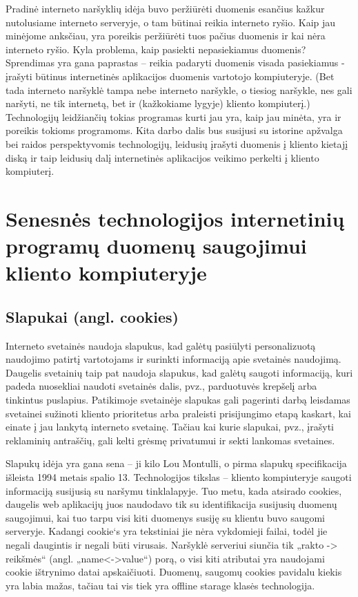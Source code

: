 \documentclass[12pt,a4paper,titlepage]{article}
\begin{document}
Pradinė interneto naršyklių idėja buvo peržiūrėti duomenis esančius kažkur nutolusiame interneto serveryje, o tam būtinai reikia interneto ryšio. Kaip jau minėjome anksčiau, yra poreikis peržiūrėti tuos pačius duomenis ir kai nėra interneto ryšio. Kyla problema, kaip pasiekti nepasiekiamus duomenis? Sprendimas yra gana paprastas – reikia padaryti duomenis visada pasiekiamus - įrašyti būtinus internetinės aplikacijos duomenis vartotojo kompiuteryje. (Bet tada interneto naršyklė tampa nebe interneto naršykle, o tiesiog naršykle, nes gali naršyti, ne tik internetą, bet ir (kažkokiame lygyje) kliento kompiuterį.) Technologijų leidžiančių tokias programas kurti jau yra, kaip jau minėta, yra ir poreikis tokioms programoms. Kita darbo dalis bus susijusi su istorine apžvalga bei raidos perspektyvomis technologijų, leidusių įrašyti duomenis į kliento kietajį diską ir taip leidusių dalį internetinės aplikacijos veikimo perkelti į kliento kompiuterį. 

\section{Senesnės technologijos internetinių programų duomenų saugojimui kliento kompiuteryje}

\subsection{Slapukai (angl. cookies)}

Interneto svetainės naudoja slapukus, kad galėtų pasiūlyti personalizuotą naudojimo patirtį vartotojams ir surinkti informaciją apie svetainės naudojimą. Daugelis svetainių taip pat naudoja slapukus, kad galėtų saugoti informaciją, kuri padeda nuosekliai naudoti svetainės dalis, pvz., parduotuvės krepšelį arba tinkintus puslapius. Patikimoje svetainėje slapukas gali pagerinti darbą leisdamas svetainei sužinoti kliento prioritetus arba praleisti prisijungimo etapą kaskart, kai einate į jau lankytą interneto svetainę. Tačiau kai kurie slapukai, pvz., įrašyti reklaminių antraščių, gali kelti grėsmę privatumui ir sekti lankomas svetaines.

Slapukų idėja yra gana sena – ji kilo Lou Montulli, o  pirma slapukų specifikacija išleista 1994 metais spalio 13. Technologijos tikslas – kliento kompiuteryje saugoti informaciją susijusią su naršymu tinklalapyje. Tuo metu, kada atsirado cookies, daugelis web aplikacijų juos naudodavo tik su identifikacija susijusių duomenų saugojimui, kai tuo tarpu visi kiti duomenys susiję su klientu buvo saugomi serveryje. Kadangi cookie‘s yra tekstiniai jie nėra vykdomieji failai, todėl jie negali daugintis ir negali būti virusais. Naršyklė serveriui siunčia tik „rakto -> reikšmės“ (angl. „name<->value“) porą, o visi kiti atributai yra naudojami cookie ištrynimo datai apskaičiuoti. Duomenų, saugomų cookies pavidalu kiekis yra labia mažas, tačiau tai vis tiek yra offline starage klasės technologija.
\end{document}
